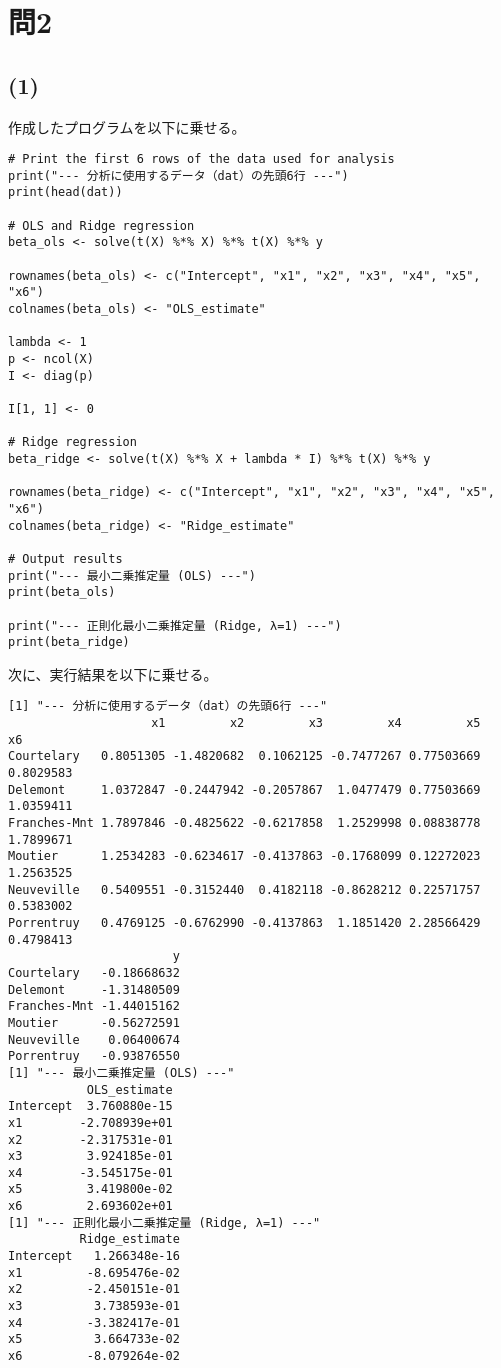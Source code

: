 \section{問2}
\subsection{(1)}
\hspace{1em}作成したプログラムを以下に乗せる。

\begin{lstlisting}[caption={最小二乗推定量と正則化最小二乗推定量を求めるプログラム}, label={code_regression}]
# Print the first 6 rows of the data used for analysis
print("--- 分析に使用するデータ（dat）の先頭6行 ---")
print(head(dat))

# OLS and Ridge regression
beta_ols <- solve(t(X) %*% X) %*% t(X) %*% y

rownames(beta_ols) <- c("Intercept", "x1", "x2", "x3", "x4", "x5", "x6")
colnames(beta_ols) <- "OLS_estimate"

lambda <- 1
p <- ncol(X)
I <- diag(p)

I[1, 1] <- 0

# Ridge regression
beta_ridge <- solve(t(X) %*% X + lambda * I) %*% t(X) %*% y

rownames(beta_ridge) <- c("Intercept", "x1", "x2", "x3", "x4", "x5", "x6")
colnames(beta_ridge) <- "Ridge_estimate"

# Output results
print("--- 最小二乗推定量 (OLS) ---")
print(beta_ols)

print("--- 正則化最小二乗推定量 (Ridge, λ=1) ---")
print(beta_ridge)
\end{lstlisting}

次に、実行結果を以下に乗せる。

\begin{lstlisting}[caption={コード\ref{code_regression}の実行結果}, label={code_output_regression}]
[1] "--- 分析に使用するデータ（dat）の先頭6行 ---"
                    x1         x2         x3         x4         x5        x6
Courtelary   0.8051305 -1.4820682  0.1062125 -0.7477267 0.77503669 0.8029583
Delemont     1.0372847 -0.2447942 -0.2057867  1.0477479 0.77503669 1.0359411
Franches-Mnt 1.7897846 -0.4825622 -0.6217858  1.2529998 0.08838778 1.7899671
Moutier      1.2534283 -0.6234617 -0.4137863 -0.1768099 0.12272023 1.2563525
Neuveville   0.5409551 -0.3152440  0.4182118 -0.8628212 0.22571757 0.5383002
Porrentruy   0.4769125 -0.6762990 -0.4137863  1.1851420 2.28566429 0.4798413
                       y
Courtelary   -0.18668632
Delemont     -1.31480509
Franches-Mnt -1.44015162
Moutier      -0.56272591
Neuveville    0.06400674
Porrentruy   -0.93876550
[1] "--- 最小二乗推定量 (OLS) ---"
           OLS_estimate
Intercept  3.760880e-15
x1        -2.708939e+01
x2        -2.317531e-01
x3         3.924185e-01
x4        -3.545175e-01
x5         3.419800e-02
x6         2.693602e+01
[1] "--- 正則化最小二乗推定量 (Ridge, λ=1) ---"
          Ridge_estimate
Intercept   1.266348e-16
x1         -8.695476e-02
x2         -2.450151e-01
x3          3.738593e-01
x4         -3.382417e-01
x5          3.664733e-02
x6         -8.079264e-02
\end{lstlisting}

